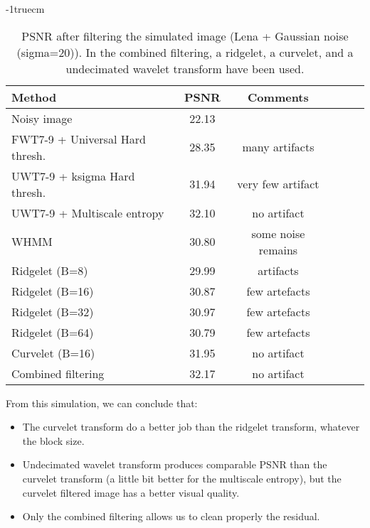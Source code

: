 \documentclass[11pt,a4paper]{article}
\begin{document}
\voffset -1truecm
\begin{table}[htb]
\begin{center}
\begin{tabular}{lccccc} \hline \hline
Method                          & PSNR   &  Comments   \\ \hline \hline
Noisy image                     & 22.13  &     \\
FWT7-9 + Universal Hard thresh. & 28.35  &    many artifacts    \\
UWT7-9 + ksigma  Hard thresh.   & 31.94  &    very few artifact \\
UWT7-9 + Multiscale entropy     & 32.10  &    no artifact       \\
WHMM                            & 30.80  &    some noise remains \\
Ridgelet (B=8)                  & 29.99  &    artifacts   \\
Ridgelet (B=16)                 & 30.87  &    few artefacts  \\
Ridgelet (B=32)                 & 30.97  &    few artefacts  \\
Ridgelet (B=64)                 & 30.79  &    few artefacts  \\
Curvelet (B=16)                 & 31.95  &    no artifact  \\ 
Combined filtering              & 32.17  &    no artifact  \\ \hline \hline
\end{tabular}
\caption{PSNR after filtering the simulated image (Lena + Gaussian noise (sigma=20)).
In the combined filtering, a ridgelet, a curvelet, and a undecimated wavelet
transform have been used.}

\vspace{0.5cm}
\label{comptab1}
\end{center}
\end{table}

From this simulation, we can conclude that:
\begin{itemize}
\item The curvelet transform do a better job than the ridgelet transform,
whatever the block size.
\item Undecimated wavelet transform produces comparable PSNR than the
curvelet transform (a little bit better for the multiscale entropy),
but the curvelet filtered image has a better visual quality.
\item Only the combined filtering allows us to clean properly the residual.
\end{itemize}
\end{document}
